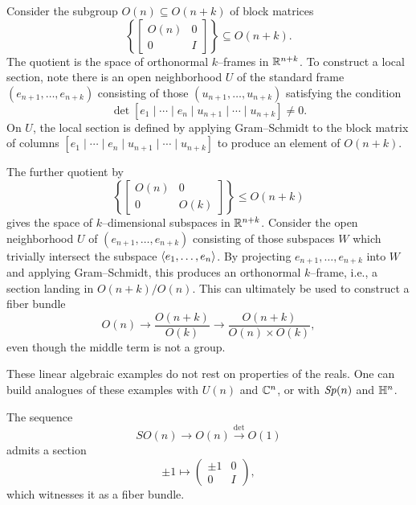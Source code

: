 \begin{example}
Consider the subgroup $O(n) \subseteq O(n+k)$ of block matrices \[\left\{\left[\begin{array}{c|c} O(n) & 0 \\ \hline 0 & I \end{array} \right]\right\} \subseteq O(n+k).\]
The quotient is the space of orthonormal $k$--frames in $\mathbb R^{n+k}$.
To construct a local section, note there is an open neighborhood $U$ of the standard frame $(e_{n+1}, \ldots, e_{n+k})$ consisting of those $(u_{n+1}, \ldots, u_{n+k})$ satisfying the condition \[\det\left[e_1 \mid \cdots \mid e_n \mid u_{n+1} \mid \cdots \mid u_{n+k}\right] \ne 0.\]
On $U$, the local section is defined by applying Gram--Schmidt to the block matrix of columns $[e_1 \mid \cdots \mid e_n \mid u_{n+1} \mid \cdots \mid u_{n+k}]$ to produce an element of $O(n+k)$.
\end{example}

\begin{example}[Grassmannians]
The further quotient by \[\left\{ \left[ \begin{array}{c|c} O(n) & 0 \\ \hline 0 & O(k) \end{array} \right] \right\} \le O(n+k)\] gives the space of $k$--dimensional subspaces in $\mathbb R^{n+k}$.
Consider the open neighborhood $U$ of $(e_{n+1}, \ldots, e_{n+k})$ consisting of those subspaces $W$ which trivially intersect the subspace $\langle e_1, \ldots, e_n\rangle$.
By projecting $e_{n+1}, \ldots, e_{n+k}$ into $W$ and applying Gram--Schmidt, this produces an orthonormal $k$--frame, i.e., a section landing in $O(n+k) / O(n)$.
This can ultimately be used to construct a fiber bundle \[O(n) \to \frac{O(n+k)}{O(k)} \to \frac{O(n+k)}{O(n) \times O(k)},\] even though the middle term is not a group.
\end{example}

\begin{example}
These linear algebraic examples do not rest on properties of the reals.
One can build analogues of these examples with $U(n)$ and $\mathbb C^n$, or with $\mathit{Sp}(n)$ and $\mathbb H^n$.
\end{example}

\begin{example}\label{SOtoOisAFiberBundle}%
The sequence \[SO(n) \to O(n) \xrightarrow{\det} O(1)\] admits a section \[\pm 1 \mapsto \left( \begin{array}{c|c} \pm 1 & 0 \\ 0 & I \end{array} \right),\] which witnesses it as a fiber bundle.
\end{example}

